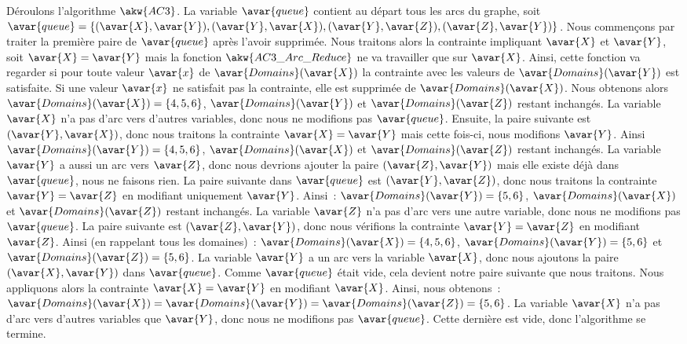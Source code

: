 \begin{example}
\begin{itemize}
\end{itemize}
%
Déroulons l'algorithme $\akw{AC3}$. La variable $\avar{queue}$ contient au
départ tous les arcs du graphe, soit $\avar{queue} = \{(\avar{X}, \avar{Y}),
(\avar{Y}, \avar{X}), (\avar{Y}, \avar{Z}), (\avar{Z}, \avar{Y})\}$. Nous
commençons par traiter la première paire de $\avar{queue}$ après l'avoir
supprimée. Nous traitons alors la contrainte impliquant $\avar{X}$ et
$\avar{Y}$, soit $\avar{X} = \avar{Y}$ mais la fonction $\akw{AC3\_Arc\_Reduce}$
ne va travailler que sur $\avar{X}$. Ainsi, cette fonction va regarder si pour
toute valeur $\avar{x}$ de $\avar{Domains}(\avar{X})$ la contrainte avec les
valeurs de $\avar{Domains}(\avar{Y})$ est satisfaite. Si une valeur $\avar{x}$
ne satisfait pas la contrainte, elle est supprimée de
$\avar{Domains}(\avar{X})$. Nous obtenons alors $\avar{Domains}(\avar{X}) = \{4,
5, 6\}$, $\avar{Domains}(\avar{Y})$ et $\avar{Domains}(\avar{Z})$ restant
inchangés. La variable $\avar{X}$ n'a pas d'arc vers d'autres variables, donc
nous ne modifions pas $\avar{queue}$.  Ensuite, la paire suivante est
$(\avar{Y}, \avar{X})$, donc nous traitons la contrainte $\avar{X} = \avar{Y}$
mais cette fois-ci, nous modifions $\avar{Y}$.  Ainsi $\avar{Domains}(\avar{Y})
= \{4, 5, 6\}$, $\avar{Domains}(\avar{X})$ et $\avar{Domains}(\avar{Z})$ restant
inchangés. La variable $\avar{Y}$ a aussi un arc vers $\avar{Z}$, donc nous
devrions ajouter la paire $(\avar{Z}, \avar{Y})$ mais elle existe déjà dans
$\avar{queue}$, nous ne faisons rien. La paire suivante dans $\avar{queue}$ est
$(\avar{Y}, \avar{Z})$, donc nous traitons la contrainte $\avar{Y} = \avar{Z}$
en modifiant uniquement $\avar{Y}$. Ainsi~: $\avar{Domains}(\avar{Y}) = \{5,
6\}$, $\avar{Domains}(\avar{X})$ et $\avar{Domains}(\avar{Z})$ restant
inchangés. La variable $\avar{Z}$ n'a pas d'arc vers une autre variable, donc
nous ne modifions pas $\avar{queue}$. La paire suivante est $(\avar{Z},
\avar{Y})$, donc nous vérifions la contrainte $\avar{Y} = \avar{Z}$ en modifiant
$\avar{Z}$. Ainsi (en rappelant tous les domaines)~: $\avar{Domains}(\avar{X}) =
\{4, 5, 6\}$, $\avar{Domains}(\avar{Y}) = \{5, 6\}$ et $\avar{Domains}(\avar{Z})
= \{5, 6\}$. La variable $\avar{Y}$ a un arc vers la variable $\avar{X}$, donc
nous ajoutons la paire $(\avar{X}, \avar{Y})$ dans $\avar{queue}$.  Comme
$\avar{queue}$ était vide, cela devient notre paire suivante que nous traitons.
Nous appliquons alors la contrainte $\avar{X} = \avar{Y}$ en modifiant
$\avar{X}$.  Ainsi, nous obtenons~: $\avar{Domains}(\avar{X}) =
\avar{Domains}(\avar{Y}) = \avar{Domains}(\avar{Z}) = \{5, 6\}$. La variable
$\avar{X}$ n'a pas d'arc vers d'autres variables que $\avar{Y}$, donc nous ne
modifions pas $\avar{queue}$.  Cette dernière est vide, donc l'algorithme se
termine.

\end{example}

